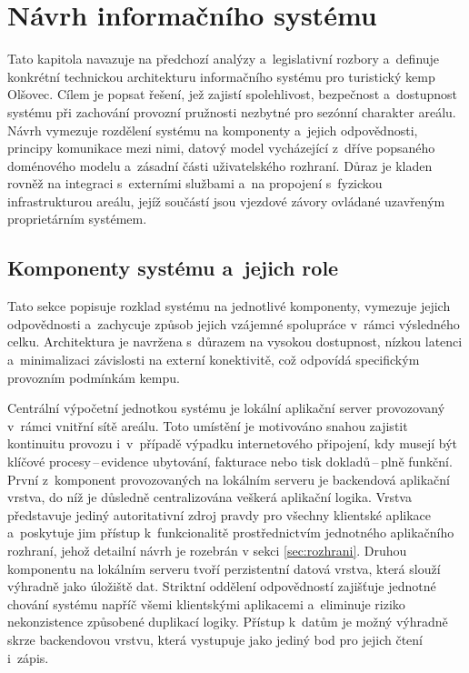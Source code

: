 \chapter{Návrh informačního systému}
\label{ch:design}
Tato kapitola navazuje na předchozí analýzy a~legislativní rozbory a~definuje konkrétní technickou architekturu informačního systému pro turistický kemp Olšovec.
Cílem je popsat řešení, jež zajistí spolehlivost, bezpečnost a~dostupnost systému při zachování provozní pružnosti nezbytné pro sezónní charakter areálu.
Návrh vymezuje rozdělení systému na komponenty a~jejich odpovědnosti, principy komunikace mezi nimi, datový model vycházející z~dříve popsaného doménového modelu a~zásadní části uživatelského rozhraní.
Důraz je kladen rovněž na integraci s~externími službami a~na propojení s~fyzickou infrastrukturou areálu, jejíž součástí jsou vjezdové závory ovládané uzavřeným proprietárním systémem.

\section{Komponenty systému a~jejich role}
\label{sec:komponenty}
Tato sekce popisuje rozklad systému na jednotlivé komponenty, vymezuje jejich odpovědnosti a~zachycuje způsob jejich vzájemné spolupráce v~rámci výsledného celku.
Architektura je navržena s~důrazem na vysokou dostupnost, nízkou latenci a~minimalizaci závislosti na externí konektivitě, což odpovídá specifickým provozním podmínkám kempu.

Centrální výpočetní jednotkou systému je lokální aplikační server provozovaný v~rámci vnitřní sítě areálu.
Toto umístění je motivováno snahou zajistit kontinuitu provozu i~v~případě výpadku internetového připojení, kdy musejí být klíčové procesy\,--\,evidence ubytování, fakturace nebo tisk dokladů\,--\,plně funkční.
První z~komponent provozovaných na lokálním serveru je backendová aplikační vrstva, do níž je důsledně centralizována veškerá aplikační logika.
Vrstva představuje jediný autoritativní zdroj pravdy pro všechny klientské aplikace a~poskytuje jim přístup k~funkcionalitě prostřednictvím jednotného aplikačního rozhraní, jehož detailní návrh je rozebrán v sekci \ref{sec:rozhrani}.
Druhou komponentu na lokálním serveru tvoří perzistentní datová vrstva, která slouží výhradně jako úložiště dat.
Striktní oddělení odpovědností zajišťuje jednotné chování systému napříč všemi klientskými aplikacemi a~eliminuje riziko nekonzistence způsobené duplikací logiky.
Přístup k~datům je možný výhradně skrze backendovou vrstvu, která vystupuje jako jediný bod pro jejich čtení i~zápis.


